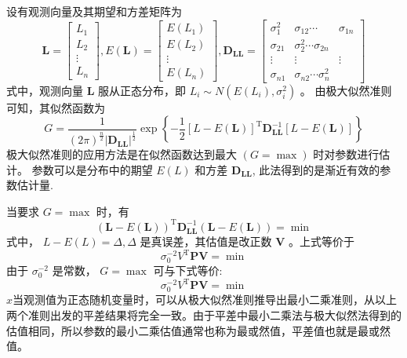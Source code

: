 \documentclass[12pt]{article}
\begin{document}
设有观测向量及其期望和方差矩阵为
\begin{equation}
	\bm{L}=\left[\begin{array}{c}
			L_{1}  \\
			L_{2}  \\
			\vdots \\
			L_{n}
		\end{array}\right], E(\bm{L})=\left[\begin{array}{c}
			E\left(L_{1}\right) \\
			E\left(L_{2}\right) \\
			\vdots              \\
			E\left(L_{n}\right)
		\end{array}\right], \bm{D}_{\bm{LL}}=\left[\begin{array}{ccc}
			\sigma_{1}^{2} & \sigma_{12} \cdots                 & \sigma_{1 n} \\
			\sigma_{21}    & \sigma_{2}^{2} \cdots \sigma_{2 n}                \\
			\vdots         & \vdots                             & \vdots       \\
			\sigma_{n 1}   & \sigma_{n 2} \cdots \sigma_{n}^{2}
		\end{array}\right]
\end{equation}
式中，观测向量 $\bm{L}$ 服从正态分布，即 $L_{i} \sim N\left(E\left(L_{i}\right), \sigma_{i}^{2}\right)$ 。
由极大似然准则可知，其似然函数为
\begin{equation}
	G=\frac{1}{(2 \pi)^{\frac{n}{2}}\left|\bm{D}_{\bm{LL}}\right|^{\frac{1}{2}}} \exp \left\{-\frac{1}{2}[L-E(\bm{L})]^{\mathrm{T}} \bm{D}_{\bm{LL}}^{-1}[L-E(\bm{L})]\right\}
\end{equation}
极大似然准则的应用方法是在似然函数达到最大 $(G=\max )$ 时对参数进行估计。 参数可以是分布中的期望 $E(L)$ 和方差 $\bm{D}_{\bm{LL}}$, 此法得到的是渐近有效的参数估计量.

当要求 $G=\max$ 时，有
\begin{equation}
	(\bm{L}-E(\bm{L}))^{\mathrm{T}} \bm{D}_{\bm{LL}}^{-1}(\bm{L}-E(\bm{L}))=\min
\end{equation}
式中， $L-E(L)=\Delta, \Delta$ 是真误差，其估值是改正数 $\bm{V}$ 。上式等价于
\begin{equation}
	\sigma_{0}^{-2} V^{\mathrm{T}} \bm{P} \bm{V}=\min
\end{equation}
由于 $\sigma_{0}^{-2}$ 是常数， $G=\max$ 可与下式等价:
\begin{equation}
	\sigma_{0}^{-2} V^{\mathrm{T}} \bm{P} \bm{V}=\min
\end{equation}
$x$当观测值为正态随机变量时，可以从极大似然准则推导出最小二乘准则，从以上两个准则出发的平差结果将完全一致。由于平差中最小二乘法与极大似然法得到的估值相同，所以参数的最小二乘估值通常也称为最或然值，平差值也就是最或然值。
\end{document}
